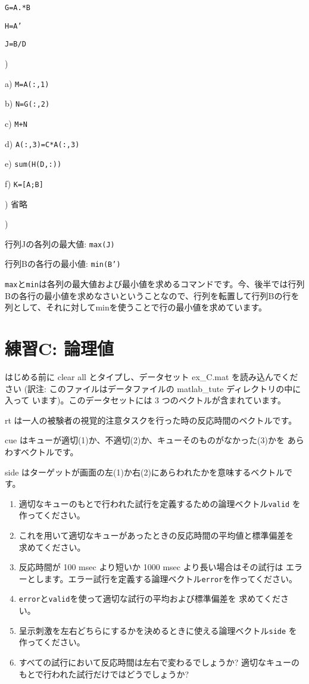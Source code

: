 \documentclass{jsarticle}
\begin{document}
{\tt G=A.*B}

{\tt H=A'}

{\tt J=B/D}

\bigskip

)

a) {\tt M=A(:,1)}

b) {\tt N=G(:,2)}

c) {\tt M+N}

d) {\tt A(:,3)=C*A(:,3)}

e) {\tt sum(H(D,:))}

f) {\tt K=[A;B]}

\bigskip

) 省略

\bigskip

)

行列Jの各列の最大値: {\tt max(J)}

行列Bの各行の最小値: {\tt min(B')}

\begin{screen}
{\tt max}と{\tt min}は各列の最大値および最小値を求めるコマンドです。今、後半では行列Bの各行の最小値を求めなさいということなので、行列を転置して行列Bの行を列として、それに対してminを使うことで行の最小値を求めています。
\end{screen}

\section{練習C: 論理値}

\begin{boxnote}
はじめる前に clear all とタイプし、データセット ex\_C.mat を読み込んでください
(訳注: このファイルはデータファイルの matlab\_tute ディレクトリの中に入って
います)。このデータセットには 3 つのベクトルが含まれています。

rt は一人の被験者の視覚的注意タスクを行った時の反応時間のベクトルです。

cue はキューが適切(1)か、不適切(2)か、キューそのものがなかった(3)かを
あらわすベクトルです。

side はターゲットが画面の左(1)か右(2)にあらわれたかを意味するベクトルです。

\begin{enumerate}
\item 適切なキューのもとで行われた試行を定義するための論理ベクトル{\tt valid}
を作ってください。
\item これを用いて適切なキューがあったときの反応時間の平均値と標準偏差を
求めてください。
\item 反応時間が 100 msec より短いか 1000 msec より長い場合はその試行は
エラーとします。エラー試行を定義する論理ベクトル{\tt error}を作ってください。
\item {\tt error}と{\tt valid}を使って適切な試行の平均および標準偏差を
求めてください。
\item 呈示刺激を左右どちらにするかを決めるときに使える論理ベクトル{\tt side}
を作ってください。
\item すべての試行において反応時間は左右で変わるでしょうか?
適切なキューのもとで行われた試行だけではどうでしょうか?
\end{enumerate}
\end{boxnote}
\end{document}

